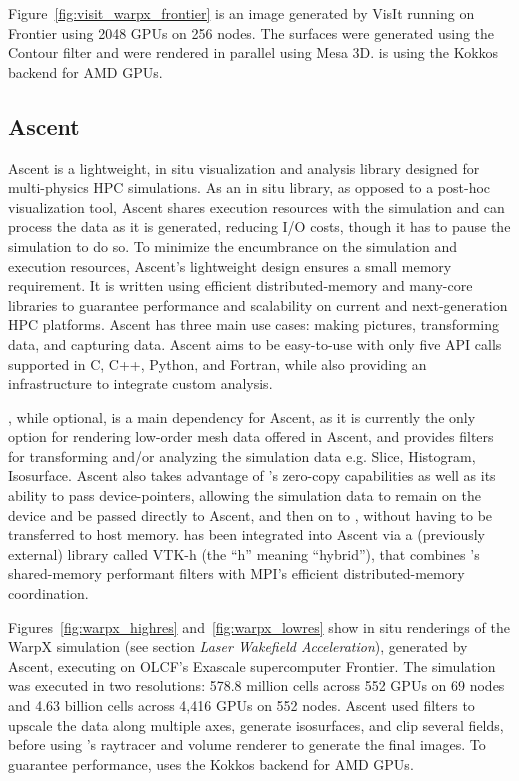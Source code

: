 Figure~\ref{fig:visit_warpx_frontier} is an image generated by VisIt running on Frontier using 2048 GPUs on 256 nodes. The surfaces were generated using the \vtkm Contour filter and were rendered in parallel using Mesa 3D. \vtkm is using the Kokkos backend for AMD GPUs.

\subsection{Ascent}
Ascent is a lightweight, in situ visualization and analysis library designed for multi-physics HPC simulations. As an in situ library, as opposed to a post-hoc visualization tool, Ascent shares execution resources with the simulation and can process the data as it is generated, reducing I/O costs, though it has to pause the simulation to do so. To minimize the encumbrance on the simulation and execution resources, Ascent's lightweight design ensures a small memory requirement. It is written using efficient distributed-memory and many-core libraries to guarantee performance and scalability on current and next-generation HPC platforms. Ascent has three main use cases: making pictures, transforming data, and capturing data. Ascent aims to be easy-to-use with only five API calls supported in C, C++, Python, and Fortran, while also providing an infrastructure to integrate custom analysis.

\vtkm, while optional, is a main dependency for Ascent, as it is currently the only option for rendering low-order mesh data offered in Ascent, and provides filters for transforming and/or analyzing the simulation data e.g. Slice, Histogram, Isosurface. Ascent also takes advantage of \vtkm's zero-copy capabilities as well as its ability to pass device-pointers, allowing the simulation data to remain on the device and be passed directly to Ascent, and then on to \vtkm, without having to be transferred to host memory. \vtkm has been integrated into Ascent via a (previously external) library called VTK-h (the ``h'' meaning ``hybrid''), that combines \vtkm's shared-memory performant filters with MPI's efficient distributed-memory coordination. 

Figures~\ref{fig:warpx_highres} and~\ref{fig:warpx_lowres} show in situ renderings of the WarpX simulation (see section \textit{Laser Wakefield Acceleration}), generated by Ascent, executing on OLCF's Exascale supercomputer Frontier.
The simulation was executed in two resolutions: 578.8 million cells across 552 GPUs on 69 nodes and 4.63 billion cells across 4,416 GPUs on 552 nodes.
Ascent used \vtkm filters to upscale the data along multiple axes, generate isosurfaces, and clip several fields, before using \vtkm's raytracer and volume renderer to generate the final images.
To guarantee performance, \vtkm uses the Kokkos backend for AMD GPUs. 


